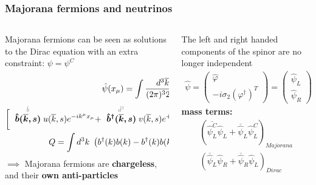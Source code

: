 \documentclass{beamer}
\begin{document}
	\begin{frame}
		\frametitle{Majorana fermions and neutrinos}
		\begin{columns}[c] %
			
			\begin{column}{.45\textwidth} %
			{\footnotesize Majorana fermions can be seen as solutions to the Dirac equation with an extra constraint:
			$\psi = \psi^C$				
			}
			
			{\tiny
			\begin{eqnarray*}
			\hat{\psi}(x_{\mu}) = \int \frac{d^3 \overline{k}}{(2\pi)^3 2 \omega_k} \sum_s & \\
			\bigg[\ \stackrel{\textcolor{gray}{\hat{b}}}{\boldsymbol{\hat{b}(\overline{k},s)}}u(\overline{k},s)e^{-ik^{\mu}x_{\mu}}
			 + \ \stackrel{\textcolor{gray}{\hat{d}^{\dagger}}}{\boldsymbol{\hat{b}^{\dagger}(\overline{k},s)}}v(\overline{k},s)e^{+ik^{\mu}x_{\mu}} \bigg] & \\
			 Q = \int d^3k \  \left(b^{\dagger}(k)b(k) - b^{\dagger}(k)b(k)\right) = 0
			\end{eqnarray*}
			}
			{\footnotesize $\implies$ Majorana fermions are \textbf{chargeless}, and their \textbf{own anti-particles}}
			\end{column}
			\hspace{25pt}
			\vrule{}
			\hspace{15pt}
			\begin{column}{.5\textwidth} %
			{\footnotesize The left and right handed components of the spinor are no longer independent}
			\begin{eqnarray*}
			\hat{\psi} = \begin{pmatrix}
			\hat{\varphi} \\
			-i\sigma_2(\varphi^{\dagger})^T
			\end{pmatrix} =  \begin{pmatrix}
			\hat{\psi}_L \\
			\hat{\psi}_R
			\end{pmatrix}
			\end{eqnarray*}
			{\footnotesize \textbf{mass terms:}}
			\begin{eqnarray*}
			\left( \overline{\hat{\psi}^C_L} \hat{\psi}_L + \overline{\hat{\psi}}_L \hat{\psi}^C_L \right)_{Majorana} \\
			 \left(\overline{\hat{\psi}}_L \hat{\psi}_R + \overline{\hat{\psi}}_R \hat{\psi}_L\right)_{Dirac}
			\end{eqnarray*}
			\end{column}
		\end{columns}
	\end{frame}	
	
\end{document}
